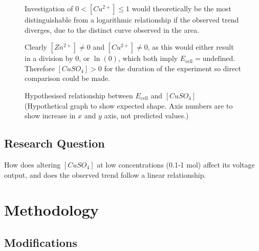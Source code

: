 \documentclass[10.5pt,a4paper]{article}
\begin{document}
\begin{figure}[h]
\begin{minipage}{0.5\textwidth}
	
	
\caption{Hypothesised relationship between $E_\textrm{cell}$ and $\left[CuSO_4\right]$	(Hypothetical graph to show expected shape. Axis numbers are to show increase in $x$ and $y$ axis, not predicted values.)}
\end{minipage}%
\begin{minipage}{0.001\textwidth}
	\hspace*{0.001cm}
\end{minipage}
\begin{minipage}{0.38\textwidth}
Investigation of $0<[Cu^{2+}]\leq1$ would theoretically be the most distinguishable from a logarithmic relationship if the observed trend diverges, due to the distinct curve observed in the area. 

Clearly $[Zn^{2+}]\neq 0$ and $[Cu^{2+}]\neq 0$, as this would either result in a division by 0, or $\ln(0)$, which both imply $E_\textrm{cell}=\textrm{undefined}$. Therefore $[CuSO_4]>0$ for the duration of the experiment so direct comparison could be made.
\vspace{2cm}
\end{minipage}
\end{figure}





\subsection{Research Question}
How does altering $[CuSO_4]$ at low concentrations (0.1-1 mol) affect its voltage output, and does the observed trend follow a linear relationship.
\section{Methodology}
\subsection{Modifications}
\end{document}
